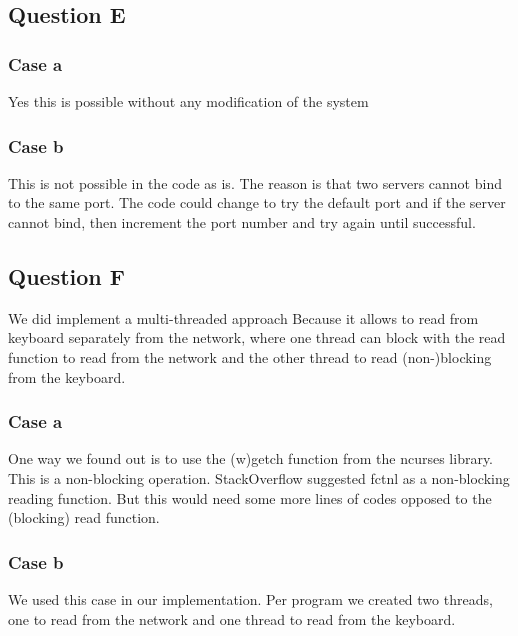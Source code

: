 \documentclass[11pt]{article}
\begin{document}
\subsection{Question E}
\subsubsection{Case a}
Yes this is possible without any modification of the system
\subsubsection{Case b}
This is not possible in the code as is. The reason is that two servers cannot bind to the same port. The code could change to try the default port and if the server cannot bind, then increment the port number and try again until successful.
\subsection{Question F}
We did implement a multi-threaded approach Because it allows to read from keyboard separately from the network, where one thread can block with the read function to read from the network and the other thread to read (non-)blocking from the keyboard.
\subsubsection{Case a}
One way we found out is to use the (w)getch function from the ncurses library. This is a non-blocking operation. StackOverflow suggested fctnl as a non-blocking reading function. But this would need some more lines of codes opposed to the (blocking) read function.
\subsubsection{Case b}
We used this case in our implementation. Per program we created two threads, one to read from the network and one thread to read from the keyboard.
\end{document}
